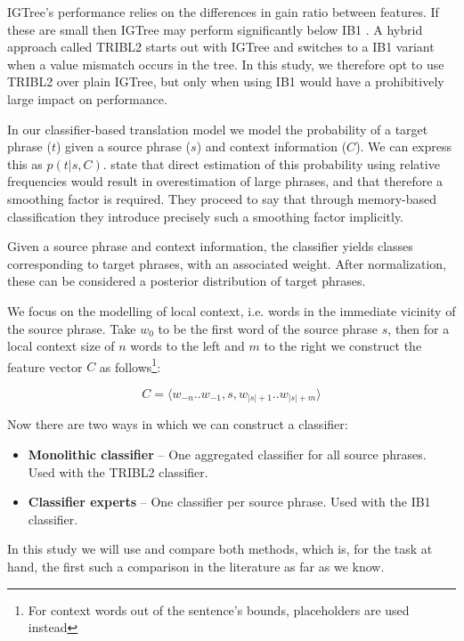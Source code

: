 IGTree's performance relies on the differences in gain ratio between
features. If these are small then IGTree may perform significantly below IB1
\citep{TIMBL}. A hybrid approach called TRIBL2 \citep{TIMBL} starts out with
IGTree and switches to a IB1 variant when a value mismatch occurs in the tree.
In this study, we therefore opt to use TRIBL2 over plain IGTree, but only when
using IB1 would have a prohibitively large impact on performance.

In our classifier-based translation model we model the probability
of a target phrase ($t$) given a source phrase ($s$) and context information
($C$). We can express this as $p(t|s,C)$.  \cite{Stroppa+07} state that
direct estimation of this probability using relative frequencies would result
in overestimation of large phrases, and that therefore a smoothing factor is
required. They proceed to say that through memory-based classification they
introduce precisely such a smoothing factor implicitly.

Given a source phrase and context information, the classifier yields classes
corresponding to target phrases, with an associated weight. After
normalization, these can be considered a posterior distribution of
target phrases. 

We focus on the modelling of local context, i.e. words in the
immediate vicinity of the source phrase. Take $w_0$ to be the first word of
the source phrase $s$, then for a local context size of $n$ words to the left and
$m$ to the right we construct the feature vector $C$ as
follows\footnote{For context words out of the sentence's bounds, placeholders
are used instead}:

\begin{equation}
  C = \langle w_{-n} .. w_{-1} , s , w_{|s|+1} .. w_{|s|+m} \rangle
\end{equation}

Now there are two ways in which we can construct a classifier:

\begin{itemize}
  \item \textbf{Monolithic classifier} -- One aggregated classifier for all
    source phrases. Used with the TRIBL2 classifier.
  \item \textbf{Classifier experts} -- One classifier per source phrase. Used
      with the IB1 classifier.
\end{itemize}

In this study we will use and compare both methods, which is, for the task at
hand, the first such a comparison in the literature as far as we know.

